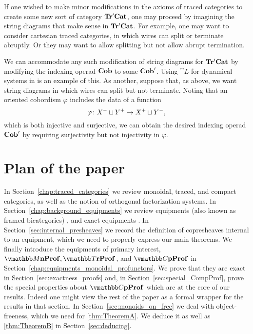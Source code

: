 \documentclass[11pt,oneside,article]{memoir}
\begin{document}
If one wished to make minor modifications in the axioms of traced categories to create some new sort of category $\mathbf{Tr'Cat}$, one may proceed by imagining the string diagrams that make sense in $\mathbf{Tr'Cat}$. For example, one may want to consider cartesian traced categories, in which wires can split or terminate abruptly. Or they may want to allow splitting but not allow abrupt termination. 
\begin{center}
\end{center}
We can accommodate any such modification of string diagrams for $\mathbf{Tr'Cat}$ by modifying the indexing operad $\mathbf{Cob}$ to some $\mathbf{Cob}'$. Using $\cat{L}$ for dynamical systems in \cite{VagnerSpivakLerman} is an example of this. As another, suppose that, as above, we want string diagrams in which wires can split but not terminate. Noting that an oriented cobordism $\varphi$ includes the data of a function
$$\varphi\colon X^-\sqcup Y^+\to X^+\sqcup Y^-,$$ 
which is both injective and surjective, we can obtain the desired indexing operad $\mathbf{Cob}'$ by requiring surjectivity but not injectivity in $\varphi$.


\section{Plan of the paper} 

In Section~\ref{chap:traced_categories} we review monoidal, traced, and compact categories, as well as the notion of orthogonal factorization systems. In Section~\ref{chap:background_equipments} we review equipments (also known as framed bicategories) \cite{Wood} \cite{Shulman}, and exact equipments \cite{Schultz2015}. In Section~\ref{sec:internal_presheaves} we record the definition of copresheaves internal to an equipment, which we need to properly express our main theorems. We finally introduce the equipments of primary interest, $\dMonProf, \dTrProf$, and $\dCompProf$ in Section~\ref{chap:equipments_monoidal_profunctors}. We prove that they are exact in Section~\ref{sec:exactness_proofs} and, in Section~\ref{sec:special_CompProf}, prove the special properties about $\dCompProf$ which are at the core of our results. Indeed one might view the rest of the paper as a formal wrapper for the results in that section. In Section~\ref{sec:monoids_on_free} we deal with object-freeness, which we need for \ref{thm:TheoremA}. We deduce it as well as \ref{thm:TheoremB} in Section~\ref{sec:deducing}.
\end{document}
